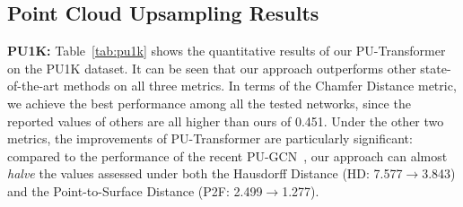 \begin{table}
\begin{center}
\captionsetup{font=small, skip=3pt}
\caption{Quantitative comparisons to state-of-the-art methods on the \emph{PU-GAN} dataset~\cite{li2019pu}. (All metric units are ${10}^{-3}$. The best results are denoted in \textbf{bold}.)}
\end{center}
\end{table}


\subsection{Point Cloud Upsampling Results}
\label{sec:results}
\noindent \textbf{PU1K:}
Table~\ref{tab:pu1k} shows the quantitative results of our PU-Transformer on the PU1K dataset. It can be seen that our approach outperforms other state-of-the-art methods on all three metrics. In terms of the Chamfer Distance metric, we achieve the best performance among all the tested networks, since the reported values of others are all higher than ours of 0.451. Under the other two metrics, the improvements of PU-Transformer are particularly significant: compared to the performance of the recent PU-GCN~\cite{qian2021pu}, our approach can almost \emph{halve} the values assessed under both the Hausdorff Distance (HD: 7.577$\rightarrow$3.843) and the Point-to-Surface Distance (P2F: 2.499$\rightarrow$1.277). 

